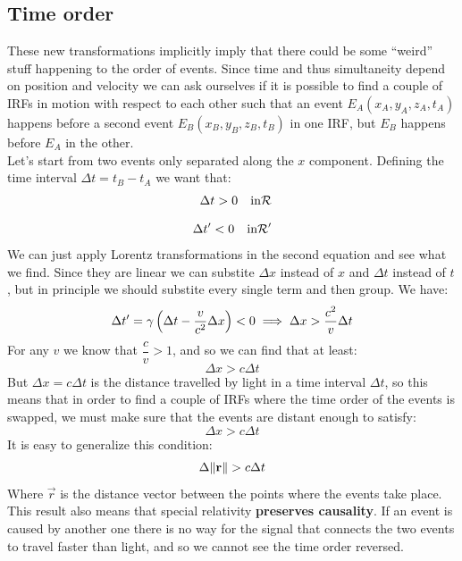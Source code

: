 \subsection{Time order}
These new transformations implicitly imply that there could be some ``weird'' stuff happening to the order of events. Since time and thus simultaneity depend on position and velocity we can ask ourselves if it is possible to find a couple of IRFs in motion with respect to each other such that an event $E_A(x_A,y_A,z_A,t_A)$ happens before a second event $E_B(x_B,y_B,z_B,t_B)$ in one IRF, but $E_B$ happens before $E_A$ in the other.\\
Let's start from two events only separated along the $x$ component. Defining the time interval $\Delta t = t_B - t_A$ we want that:
\begin{equation}
  \begin{split}
    \Delta t > 0 \quad \text{in} \mathcal{R} \\[8pt]
    \Delta t' < 0 \quad \text{in} \mathcal{R}'
  \end{split}
\end{equation}
We can just apply Lorentz transformations in the second equation and see what we find. Since they are linear we can substite $\Delta x$ instead of $x$ and $\Delta t$ instead of $t$, but in principle we should substite every single term and then group. We have:
\begin{equation}
  \Delta t' = \gamma \left(\Delta t - \dfrac{v}{c^2}\Delta x\right) < 0 \implies \Delta x > \dfrac{c^2}{v}\Delta t
\end{equation}
For any $v$ we know that $\dfrac{c}{v} > 1$, and so we can find that at least:
\begin{equation}
  \Delta x > c\Delta t
\end{equation}
But $\Delta x = c\Delta t$ is the distance travelled by light in a time interval $\Delta t$, so this means that in order to find a couple of IRFs where the time order of the events is swapped, we must make sure that the events are distant enough to satisfy:
\begin{equation}
  \Delta x > c\Delta t
\end{equation}
It is easy to generalize this condition:
\begin{equation}
  \Delta \norm{\vb{r}} > c\Delta t
\end{equation}
Where $\vec{r}$ is the distance vector between the points where the events take place.\\
This result also means that special relativity \textbf{preserves causality}. If an event is caused by another one there is no way for the signal that connects the two events to travel faster than light, and so we cannot see the time order reversed.
